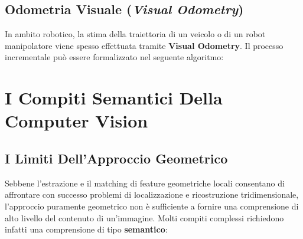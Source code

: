 ﻿\documentclass[11pt, a4paper]{article}
\begin{document}
\subsection{Odometria Visuale (\emph{Visual Odometry})}

In ambito robotico, la stima della traiettoria di un veicolo o di un robot manipolatore viene spesso effettuata tramite \textbf{Visual Odometry}. Il processo incrementale può essere formalizzato nel seguente algoritmo:

\begin{algorithm}[H]
\caption{Algoritmo Di Odometria Visuale}
\label{alg:visual_odometry}
\;
\end{algorithm}


\newpage

\section{I Compiti Semantici Della Computer Vision}

\subsection{I Limiti Dell'Approccio Geometrico}

Sebbene l'estrazione e il matching di feature geometriche locali consentano di affrontare con successo problemi di localizzazione e ricostruzione tridimensionale, l'approccio puramente geometrico non è sufficiente a fornire una comprensione di alto livello del contenuto di un'immagine. Molti compiti complessi richiedono infatti una comprensione di tipo \textbf{semantico}:
\end{document}
